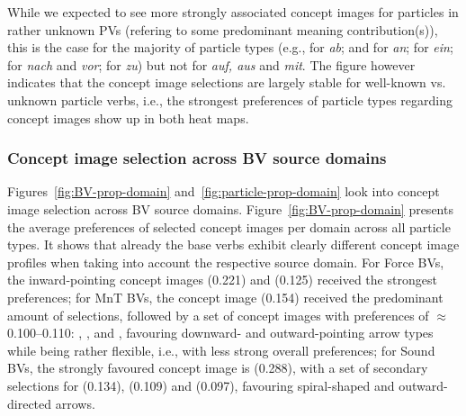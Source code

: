 \documentclass[output=paper]{langsci/langscibook}
\begin{document}
While we expected to see more strongly associated concept images for
particles in rather unknown PVs (refering to some predominant meaning
contribution(s)), this is the case for the majority of particle types
(e.g.,  for \textit{ab}; 
and  for \textit{an};  for
\textit{ein};  for \textit{nach} and \textit{vor};
 for \textit{zu}) but not for \textit{auf, aus} and
\textit{mit}. The figure however indicates that the concept image
selections are largely stable for well-known vs. unknown particle
verbs, i.e., the strongest preferences of particle types regarding
concept images show up in both heat maps.


\subsubsection{Concept image selection across BV source domains}

Figures~\ref{fig:BV-prop-domain} and~\ref{fig:particle-prop-domain}
look into concept image selection across BV source
domains. Figure~\ref{fig:BV-prop-domain} presents the average
preferences of selected concept images per domain across all particle
types. It shows that already the base verbs exhibit clearly different
concept image profiles when taking into account the respective source
domain. For Force BVs, the inward-pointing concept images
 (0.221) and  (0.125) received the
strongest preferences; for MnT BVs, the concept image
 (0.154) received the predominant amount of
selections, followed by a set of concept images with preferences of
$\approx$0.100--0.110: , ,
 and , favouring
downward- and outward-pointing arrow types while being rather
flexible, i.e., with less strong overall preferences; for
Sound BVs, the strongly favoured concept image is
 (0.288), with a set of secondary selections for
 (0.134),  (0.109) and
 (0.097), favouring spiral-shaped and
outward-directed arrows.
\end{document}
